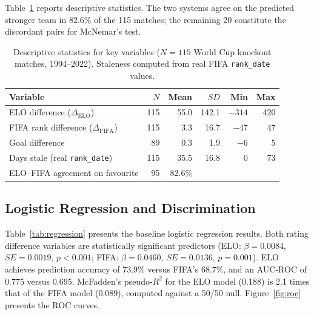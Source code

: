 \documentclass[12pt, a4paper]{article}
\begin{document}
Table~\ref{tab:descriptive} reports descriptive statistics. The two systems agree on the
predicted stronger team in 82.6\% of the 115 matches; the remaining 20 constitute the
discordant pairs for McNemar's test.

\begin{table}[H]
  \centering
  \caption{Descriptive statistics for key variables ($N = 115$ World Cup knockout matches,
  1994--2022). Staleness computed from real FIFA \texttt{rank\_date} values.}
  \label{tab:descriptive}
  \begin{tabular}{lrrrrr}
    \toprule
    Variable & $N$ & Mean & $SD$ & Min & Max \\
    \midrule
    ELO difference ($\Delta_{\text{ELO}}$)       & 115 & 55.0  & 142.1 & $-314$ & 420 \\
    FIFA rank difference ($\Delta_{\text{FIFA}}$) & 115 &  3.3  &  16.7 & $-47$  &  47 \\
    Goal difference                               &  89 &  0.3  &   1.9 & $-6$   &   5 \\
    Days stale (real \texttt{rank\_date})         & 115 & 35.5  &  16.8 &    0   &  73 \\
    ELO--FIFA agreement on favourite              &  95 & 82.6\%&       &        &     \\
    \bottomrule
  \end{tabular}
\end{table}

\subsection{Logistic Regression and Discrimination}

Table~\ref{tab:regression} presents the baseline logistic regression results. Both rating
difference variables are statistically significant predictors (ELO: $\beta = 0.0084$,
$SE = 0.0019$, $p < 0.001$; FIFA: $\beta = 0.0460$, $SE = 0.0136$, $p = 0.001$). ELO
achieves prediction accuracy of 73.9\% versus FIFA's 68.7\%, and an AUC-ROC of 0.775 versus
0.695. McFadden's pseudo-$R^{2}$ for the ELO model (0.188) is 2.1 times that of the FIFA
model (0.089), computed against a 50/50 null. Figure~\ref{fig:roc} presents the ROC curves.
\end{document}
